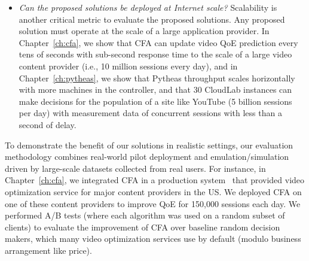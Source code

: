 \begin{itemize}
\item {\em Can the proposed solutions be deployed at Internet scale?}
Scalability is another critical metric to evaluate the proposed solutions. 
Any proposed solution must operate at the scale of a large application 
provider.
In Chapter~\ref{ch:cfa}, we show that CFA can update video QoE 
prediction every tens of seconds with sub-second response 
time to the scale of a large video content provider (i.e., 10 million sessions every day), 
and in Chapter~\ref{ch:pytheas}, we show that Pytheas throughput 
scales horizontally with more machines in the controller, and that 
30 CloudLab instances can make decisions for the population of a site
like YouTube (5 billion sessions per day) with measurement data of 
concurrent sessions with less than a second of delay.

\end{itemize}


To demonstrate the benefit of our solutions in realistic settings, 
our evaluation methodology combines real-world pilot deployment and 
emulation/simulation driven by large-scale datasets collected from real  users.
For instance, in Chapter~\ref{ch:cfa}, we integrated CFA in a production 
system~\cite{c3} that provided video optimization service for major content
providers in the US.
We deployed CFA on one of these content providers to improve QoE for
150,000 sessions each day. We performed A/B tests (where each algorithm
was used on a random subset of clients) to evaluate
the improvement of CFA over baseline random decision
makers, which many video optimization services use 
by default (modulo business arrangement like price).

